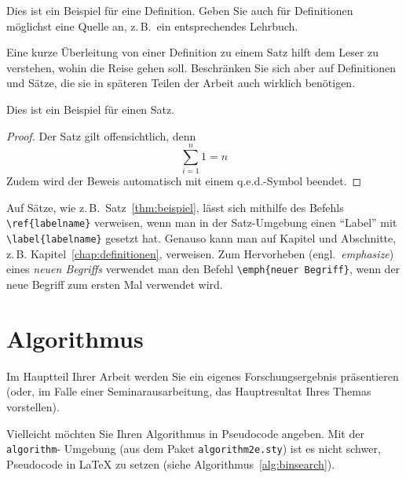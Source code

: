 \documentclass[bachelor,german]{info1thesis}
\begin{document}
\begin{definition}
  Dies ist ein Beispiel für eine Definition.
  Geben Sie auch für Definitionen möglichst eine Quelle an, z.\,B.\ ein entsprechendes Lehrbuch.
\end{definition}

Eine kurze Überleitung von einer Definition zu einem Satz hilft dem Leser zu verstehen, wohin die Reise gehen soll.
Beschränken Sie sich aber auf Definitionen und Sätze, die sie in späteren Teilen der Arbeit auch wirklich benötigen.

\begin{satz}[Beispielsatz] \label{thm:beispiel}
  Dies ist ein Beispiel für einen Satz.
\end{satz}

\begin{proof}
  Der Satz gilt offensichtlich, denn
  \begin{equation*}
    \sum_{i=1}^{n} 1 = n
  \end{equation*}
  Zudem wird der Beweis automatisch mit einem q.e.d.-Symbol beendet.
\end{proof}

Auf Sätze, wie z.\,B.\ Satz~\ref{thm:beispiel}, lässt sich mithilfe des Befehls \verb+\ref{labelname}+ verweisen, wenn man in der Satz-Umgebung einen "`Label"' mit \verb+\label{labelname}+ gesetzt hat. 
Genauso kann man auf Kapitel und Abschnitte, z.\,B. Kapitel~\ref{chap:definitionen}, verweisen.
Zum Hervorheben (engl.\ \emph{emphasize}) eines \emph{neuen Begriffs} verwendet man den Befehl \verb+\emph{neuer Begriff}+, wenn der neue Begriff zum ersten Mal verwendet wird.


\chapter{Algorithmus}
Im Hauptteil Ihrer Arbeit werden Sie ein eigenes Forschungsergebnis präsentieren (oder, im Falle einer Seminarausarbeitung, das Hauptresultat Ihres Themas vorstellen).


Vielleicht möchten Sie Ihren Algorithmus in Pseudocode angeben. 
Mit der \verb+algorithm+- Umgebung (aus dem Paket \verb+algorithm2e.sty+) ist es nicht schwer, Pseudocode in \LaTeX{} zu setzen (siehe Algorithmus~\ref{alg:binsearch}).
\end{document}
